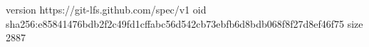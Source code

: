 version https://git-lfs.github.com/spec/v1
oid sha256:e85841476bdb2f2c49fd1cffabc56d542cb73ebfb6d8bdb068f8f27d8ef46f75
size 2887
